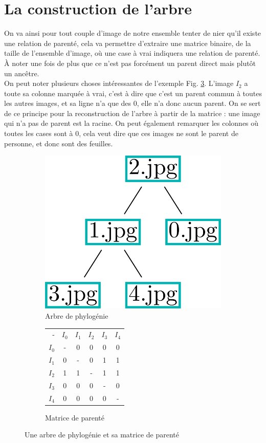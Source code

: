 \documentclass[utf8]{stageM2R} %
\begin{document}
\section{La construction de l'arbre}
On va ainsi pour tout couple d'image de notre ensemble tenter de nier qu'il existe une relation de parenté, cela va permettre d'extraire une matrice binaire, de la taille de l'ensemble d'image, où une case à vrai indiquera une relation de parenté. À noter une fois de plus que ce n'est pas forcément un parent direct mais plutôt un ancêtre. \\ \indent
On peut noter plusieurs choses intéressantes de l'exemple Fig. \ref{parentage_tree}. L'image $I_{2}$ a toute sa colonne marquée à vrai, c'est à dire que c'est un parent commun à toutes les autres images, et sa ligne n'a que des 0, elle n'a donc aucun parent. On se sert de ce principe pour la reconstruction de l'arbre à partir de la matrice : une image qui n'a pas de parent est la racine. On peut également remarquer les colonnes où toutes les cases sont à 0, cela veut dire que ces images ne sont le parent de personne, et donc sont des feuilles.

\begin{figure}
  \begin{subfigure}{.5\textwidth}
    \centering
    \includegraphics[width=.5\linewidth]{images/algo_tree.png}
    \caption{Arbre de phylogénie}
    \label{algo_tree}
  \end{subfigure}%
  \begin{subfigure}{.5\textwidth}
    \centering
    \begin{tabular}{|r||c|c|c|c|c|}
      \hline
      - & $I_{0}$ & $I_{1}$ & $I_{2}$ & $I_{3}$ & $I_{4}$ \\ \hhline{|=||=|=|=|=|=|}
      $I_{0}$ & - & 0 & 0 & 0 & 0 \\ \hline
      $I_{1}$ & 0 & - & 0 & 1 & 1 \\ \hline
      $I_{2}$ & 1 & 1 & - & 1 & 1 \\ \hline
      $I_{3}$ & 0 & 0 & 0 & - & 0 \\ \hline
      $I_{4}$ & 0 & 0 & 0 & 0 & - \\ \hline
    \end{tabular} 
    \caption{Matrice de parenté}
    \label{parentage_matrix}
  \end{subfigure}
  \caption{Une arbre de phylogénie et sa matrice de parenté}
  \label{parentage_tree}
\end{figure}
\end{document}
